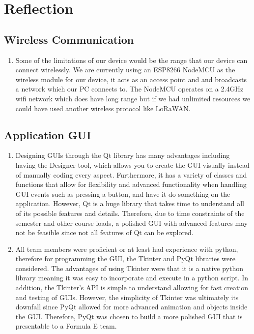\documentclass[12pt, titlepage]{article}
\begin{document}
\newpage
\section{Reflection}
\subsection{Wireless Communication}
\begin{enumerate}
  \item Some of the limitations of our device would be the range that our device can connect wirelessly. We are currently using an ESP8266 NodeMCU as the wireless module for our device, it acts as an access point and and broadcasts a network which our PC connects to. The NodeMCU operates on a 2.4GHz wifi network which does have long range but if we had unlimited resources we could have used another wireless protocol like LoRaWAN.
  
\end{enumerate}

\subsection{Application GUI}
\begin{enumerate}
  \item Designing GUIs through the Qt library has many advantages including having the Designer tool, which allows you to create the GUI visually instead of manually coding every aspect. Furthermore, it has a variety of classes and functions that allow for flexibility and advanced functionality when handling GUI events such as pressing a button, and have it do something on the application. However, Qt is a huge library that takes time to understand all of its possible features and details. Therefore, due to time constraints of the semester and other course loads, a polished GUI with advanced features may not be feasible since not all features of Qt can be explored.
  \item All team members were proficient or at least had experience with python, therefore for programming the GUI, the Tkinter and PyQt libraries were considered. The advantages of using Tkinter were that it is a native python library meaning it was easy to incorporate and execute in a python script. In addition, the Tkinter’s API is simple to understand allowing for fast creation and testing of GUIs. However, the simplicity of Tkinter was ultimately its downfall since PyQt allowed for more advanced animation and objects inside the GUI. Therefore, PyQt was chosen to build a more polished GUI that is presentable to a Formula E team.
\end{enumerate}
\end{document}
